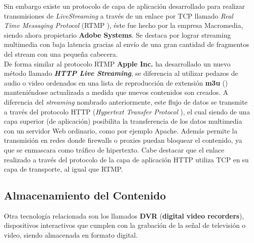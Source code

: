 Sin embargo existe un protocolo de capa de aplicación desarrollado para realizar transmisiones de \textit{LiveStreaming} a través de un enlace por TCP llamado \textit{Real Time Messaging Protocol} (RTMP \cite{bib:rtmp-specs}), éste fue hecho por la empresa Macromedia, siendo ahora propietario \textbf{Adobe Systems}. Se destaca por lograr streaming multimedia con baja latencia gracias al envío de una gran cantidad de fragmentos del stream con una pequeña cabecera. \\

	
	De forma similar al protocolo RTMP \textbf{Apple Inc.} ha desarrollado un nuevo método llamado \textit{\textbf{HTTP Live Streaming}}, se diferencia al utilizar pedazos de audio o video  ordenados en una lista de reproducción de extensión \textbf{m3u} (\cite{sota:m3u-specs}) manteniéndose actualizada a medida que nuevos contenidos son creados. A diferencia del \textit{streaming} nombrado anteriormente, este flujo de datos se transmite a través del protocolo HTTP (\textit{Hypertext Transfer Protocol} \cite{sota:rfc-http}), el cual siendo de una capa superior (de aplicación) posibilita la transferencia de los datos multimedia con un servidor Web ordinario, como por ejemplo Apache. Además permite la transmisión en redes donde firewalls o proxies puedan bloquear el contenido, ya que se enmascara como tráfico de hipertexto. Cabe destacar que el enlace realizado a través del protocolo de la capa de aplicación HTTP utiliza TCP en su capa de transporte, al igual que RTMP.


\subsection{Almacenamiento del Contenido}

Otra tecnología relacionada son los llamados \textbf{DVR} (\textbf{digital video recorders}), dispositivos interactivos que cumplen con la grabación de la señal de televisión o video, siendo almacenada en formato digital.\\

